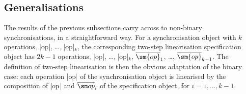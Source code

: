 


\subsection{Generalisations}
\label{ssec:relating-variations}

The results of the previous subsections carry across to non-binary
synchronisations, in a straightforward way.  For a synchronisation object with
$k$ operations, |op|, \ldots, |op|$_k$, the corresponding two-step
linearisation specification object has $2k-1$ operations, |op|, \ldots,
|op|$_k$, $\overline{\sm{op}}_1$, \ldots, $\overline{\sm{op}}_{k-1}$.  The
definition of two-step linearisation is then the obvious adaptation of the
binary case: each operation |op| of the synchronisation object is
linearised by the composition of |op| and $\overline{\op}_i$ of the
specification object, for $i = 1, \ldots, k-1$.


